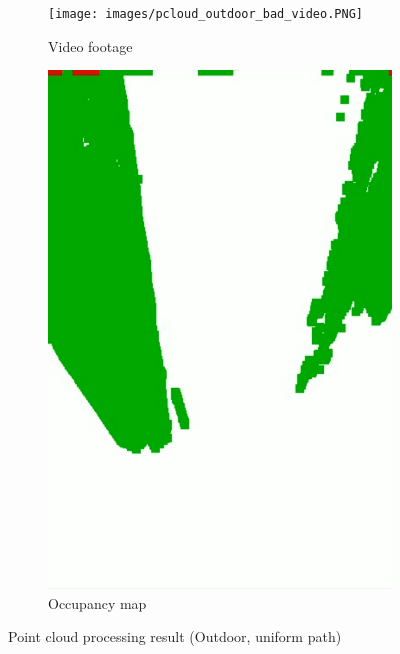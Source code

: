 \begin{figure}[b]
    \centering
    \begin{subfigure}{.64\textwidth}
        \centering
        \texttt{[image: images/pcloud\_outdoor\_bad\_video.PNG]}
        \caption{Video footage}
    \end{subfigure}
    \quad
    \begin{subfigure}{.24\textwidth}
        \centering
        \includegraphics[width=\linewidth]{images/pcloud_outdoor_bad.PNG}
        \caption{Occupancy map}
    \end{subfigure}
    \caption{Point cloud processing result (Outdoor, uniform path)}
    \label{fig:pcloud_outdoor_bad}
\end{figure}

